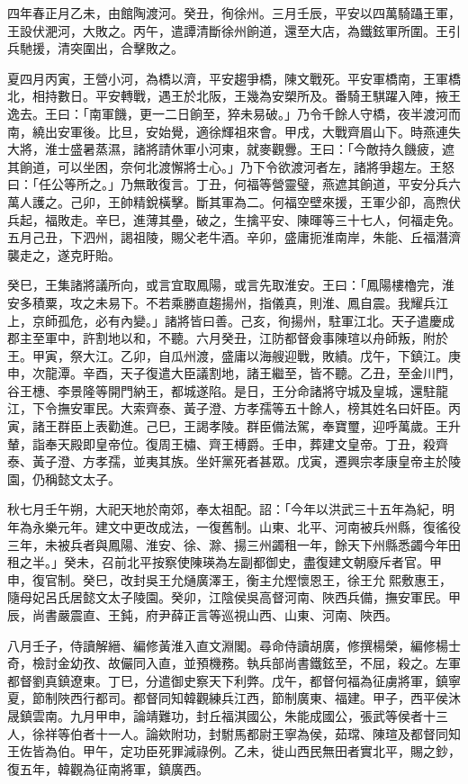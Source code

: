\begin{pinyinscope}
四年春正月乙未，由館陶渡河。癸丑，徇徐州。三月壬辰，平安以四萬騎躡王軍，王設伏淝河，大敗之。丙午，遣譚清斷徐州餉道，還至大店，為鐵鉉軍所圍。王引兵馳援，清突圍出，合擊敗之。

夏四月丙寅，王營小河，為橋以濟，平安趨爭橋，陳文戰死。平安軍橋南，王軍橋北，相持數日。平安轉戰，遇王於北阪，王幾為安槊所及。番騎王騏躍入陣，掖王逸去。王曰：「南軍饑，更一二日餉至，猝未易破。」乃令千餘人守橋，夜半渡河而南，繞出安軍後。比旦，安始覺，適徐輝祖來會。甲戌，大戰齊眉山下。時燕連失大將，淮士盛暑蒸濕，諸將請休軍小河東，就麥觀釁。王曰：「今敵持久饑疲，遮其餉道，可以坐困，奈何北渡懈將士心。」乃下令欲渡河者左，諸將爭趨左。王怒曰：「任公等所之。」乃無敢復言。丁丑，何福等營靈璧，燕遮其餉道，平安分兵六萬人護之。己卯，王帥精銳橫擊。斷其軍為二。何福空壁來援，王軍少卻，高煦伏兵起，福敗走。辛巳，進薄其壘，破之，生擒平安、陳暉等三十七人，何福走免。五月己丑，下泗州，謁祖陵，賜父老牛酒。辛卯，盛庸扼淮南岸，朱能、丘福潛濟襲走之，遂克盱貽。

癸巳，王集諸將議所向，或言宜取鳳陽，或言先取淮安。王曰：「鳳陽樓櫓完，淮安多積粟，攻之未易下。不若乘勝直趨揚州，指儀真，則淮、鳳自震。我耀兵江上，京師孤危，必有內變。」諸將皆曰善。己亥，徇揚州，駐軍江北。天子遣慶成郡主至軍中，許割地以和，不聽。六月癸丑，江防都督僉事陳瑄以舟師叛，附於王。甲寅，祭大江。乙卯，自瓜州渡，盛庸以海艘迎戰，敗績。戊午，下鎮江。庚申，次龍潭。辛酉，天子復遣大臣議割地，諸王繼至，皆不聽。乙丑，至金川門，谷王橞、李景隆等開門納王，都城遂陷。是日，王分命諸將守城及皇城，還駐龍江，下令撫安軍民。大索齊泰、黃子澄、方孝孺等五十餘人，榜其姓名曰奸臣。丙寅，諸王群臣上表勸進。己巳，王謁孝陵。群臣備法駕，奉寶璽，迎呼萬歲。王升輦，詣奉天殿即皇帝位。復周王橚、齊王榑爵。壬申，葬建文皇帝。丁丑，殺齊泰、黃子澄、方孝孺，並夷其族。坐奸黨死者甚眾。戊寅，遷興宗孝康皇帝主於陵園，仍稱懿文太子。

秋七月壬午朔，大祀天地於南郊，奉太祖配。詔：「今年以洪武三十五年為紀，明年為永樂元年。建文中更改成法，一復舊制。山東、北平、河南被兵州縣，復徭役三年，未被兵者與鳳陽、淮安、徐、滁、揚三州蠲租一年，餘天下州縣悉蠲今年田租之半。」癸未，召前北平按察使陳瑛為左副都御史，盡復建文朝廢斥者官。甲申，復官制。癸巳，改封吳王允熥廣澤王，衡主允熞懷恩王，徐王允熙敷惠王，隨母妃呂氏居懿文太子陵園。癸卯，江陰侯吳高督河南、陜西兵備，撫安軍民。甲辰，尚書嚴震直、王鈍，府尹薛正言等巡視山西、山東、河南、陜西。

八月壬子，侍讀解縉、編修黃淮入直文淵閣。尋命侍讀胡廣，修撰楊榮，編修楊士奇，檢討金幼孜、故儼同入直，並預機務。執兵部尚書鐵鉉至，不屈，殺之。左軍都督劉真鎮遼東。丁巳，分遣御史察天下利弊。戊午，都督何福為征虜將軍，鎮寧夏，節制陜西行都司。都督同知韓觀練兵江西，節制廣東、福建。甲子，西平侯沐晟鎮雲南。九月甲申，論靖難功，封丘福淇國公，朱能成國公，張武等侯者十三人，徐祥等伯者十一人。論欸附功，封駙馬都尉王寧為侯，茹瑺、陳瑄及都督同知王佐皆為伯。甲午，定功臣死罪減祿例。乙未，徙山西民無田者實北平，賜之鈔，復五年，韓觀為征南將軍，鎮廣西。


\end{pinyinscope}
